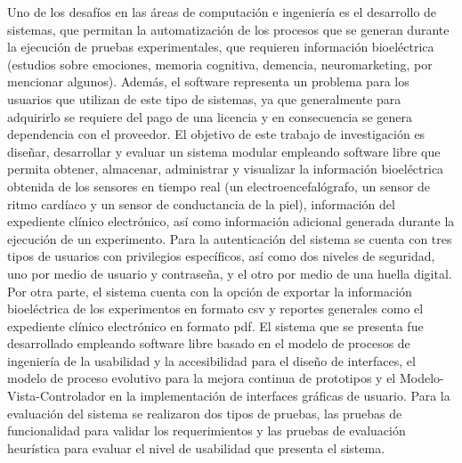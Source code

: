 
\begin{resumen}

Uno de los desafíos en las áreas de computación e ingeniería es el desarrollo de sistemas, que permitan la automatización de los procesos que se generan durante la ejecución de pruebas experimentales, que requieren información bioeléctrica (estudios sobre emociones, memoria cognitiva, demencia, neuromarketing, por mencionar algunos). Además, el software representa un problema para los usuarios que utilizan de este tipo de sistemas, ya que generalmente para adquirirlo se requiere del pago de una licencia y en consecuencia se genera dependencia con el proveedor. El objetivo de este trabajo de investigación es diseñar, desarrollar y evaluar un sistema modular empleando software libre que permita obtener, almacenar, administrar y visualizar la información bioeléctrica obtenida de los sensores en tiempo real (un electroencefalógrafo, un sensor de ritmo cardíaco y un sensor de conductancia de la piel), información del expediente clínico electrónico, así como información adicional generada durante la ejecución de un experimento. Para la autenticación del sistema se cuenta con tres tipos de usuarios con privilegios específicos, así como dos niveles de seguridad, uno por medio de usuario y contraseña, y el otro por medio de una huella digital. Por otra parte, el sistema cuenta con la opción de exportar la información bioeléctrica de los experimentos en formato csv y reportes generales como el expediente clínico electrónico en formato pdf. El sistema que se presenta fue desarrollado empleando software libre basado en el modelo de procesos de ingeniería de la usabilidad y la accesibilidad para el diseño de interfaces, el modelo de proceso evolutivo para la mejora continua de prototipos y el Modelo-Vista-Controlador en la implementación de interfaces gráficas de usuario. Para la evaluación del sistema se realizaron dos tipos de pruebas, las pruebas de funcionalidad para validar los requerimientos y las pruebas de evaluación heurística para evaluar el nivel de usabilidad que presenta el sistema.

\end{resumen}

